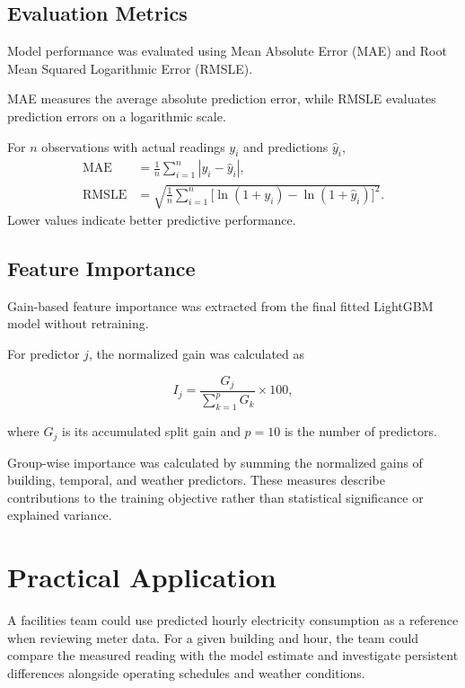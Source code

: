 \documentclass[12pt]{article}
\begin{document}
\subsection{Evaluation Metrics}

Model performance was evaluated using Mean Absolute Error (MAE) and Root Mean Squared Logarithmic Error (RMSLE).

MAE measures the average absolute prediction error, while RMSLE evaluates prediction errors on a logarithmic scale.

For $n$ observations with actual readings $y_i$ and predictions $\hat y_i$,
\begin{align}
    \mathrm{MAE} &= \frac{1}{n} \sum_{i=1}^{n} |y_i-\hat y_i|, \\
    \mathrm{RMSLE} &= \sqrt{\frac{1}{n}\sum_{i=1}^{n}
    \bigl[\ln(1+y_i)-\ln(1+\hat y_i)\bigr]^2}.
\end{align}
Lower values indicate better predictive performance.

\subsection{Feature Importance}

Gain-based feature importance was extracted from the final
fitted LightGBM model without retraining.

For predictor $j$, the normalized gain was calculated as

\begin{equation}
    I_j =
    \frac{G_j}{\sum_{k=1}^{p} G_k}\times 100,
\end{equation}

where $G_j$ is its accumulated split gain and $p=10$ is
the number of predictors.

Group-wise importance was calculated by summing the
normalized gains of building, temporal, and weather
predictors. These measures describe contributions to the
training objective rather than statistical significance
or explained variance.

\section{Practical Application}
\label{sec:practical-application}

A facilities team could use predicted hourly electricity consumption as a reference when reviewing meter data. For a given building and hour, the team could compare the measured reading with the model estimate and investigate persistent differences alongside operating schedules and weather conditions.
\end{document}
